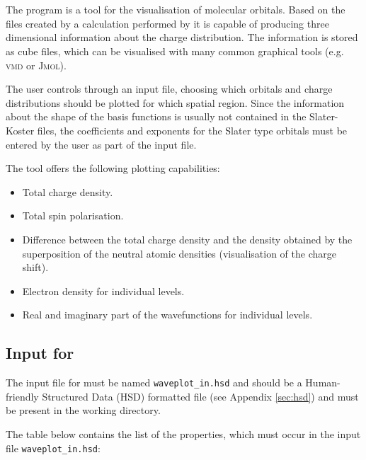 \chapter{\waveplot}

The \waveplot{} program is a tool for the visualisation of molecular orbitals.
Based on the files created by a calculation performed by \dftbp{} it is capable
of producing three dimensional information about the charge distribution. The
information is stored as cube files, which can be visualised with many common
graphical tools (e.g. \textsc{vmd} or \textsc{Jmol}).

The user controls \waveplot{} through an input file, choosing which
orbitals and charge distributions should be plotted for which spatial
region. Since the information about the shape of the basis functions
is usually not contained in the Slater-Koster files, the coefficients
and exponents for the Slater type orbitals must be entered by the user
as part of the input file.

The \waveplot{} tool offers the following plotting capabilities:
\begin{itemize}
\item Total charge density.
\item Total spin polarisation.
\item Difference between the total charge density and the density
  obtained by the superposition of the neutral atomic densities
  (visualisation of the charge shift).
\item Electron density for individual levels.
\item Real and imaginary part of the wavefunctions for individual levels.
\end{itemize}


\section{Input for \waveplot}

The input file for \waveplot{} must be named \verb|waveplot_in.hsd| and should
be a Human-friendly Structured Data (HSD) formatted file (see Appendix
\ref{sec:hsd}) and must be present in the working directory.

The table below contains the list of the properties, which must occur in the
input file \verb|waveplot_in.hsd|:

